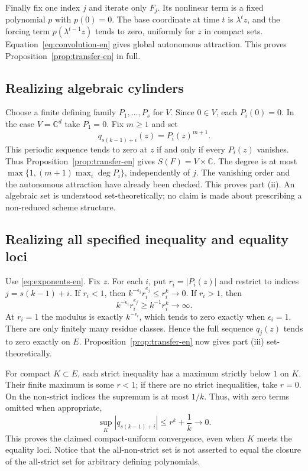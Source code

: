 \documentclass[12pt]{amsart}
\theoremstyle{definition}
\theoremstyle{remark}
\numberwithin{equation}{section}
\newcommand{\C}{\mathbb{C}}
\begin{document}
Finally fix one index $j$ and iterate only $F_j$. Its nonlinear term is a fixed polynomial $p$ with $p(0)=0$. The base coordinate at time $t$ is $\lambda^t z$, and the forcing term $p(\lambda^{t-1}z)$ tends to zero, uniformly for $z$ in compact sets. Equation~\eqref{eq:convolution-en} gives global autonomous attraction. This proves Proposition~\ref{prop:transfer-en} in full.

\subsection{Realizing algebraic cylinders}
Choose a finite defining family $P_1,\ldots,P_s$ for $V$. Since $0\in V$, each $P_i(0)=0$. In the case $V=\C^d$ take $P_1=0$. Fix $m\geq1$ and set
\[
q_{s(k-1)+i}(z)=P_i(z)^{m+1}.
\]
This periodic sequence tends to zero at $z$ if and only if every $P_i(z)$ vanishes. Thus Proposition~\ref{prop:transfer-en} gives $S(F)=V\times\C$. The degree is at most $\max\{1,(m+1)\max_i\deg P_i\}$, independently of $j$. The vanishing order and the autonomous attraction have already been checked. This proves part (ii). An algebraic set is understood set-theoretically; no claim is made about prescribing a non-reduced scheme structure.

\subsection{Realizing all specified inequality and equality loci}
Use \eqref{eq:exponents-en}. Fix $z$. For each $i$, put $r_i=|P_i(z)|$ and restrict to indices $j=s(k-1)+i$.
If $r_i<1$, then $k^{-\epsilon_i}r_i^{e_j}\leq r_i^k\to0$.
If $r_i>1$, then
\[
k^{-\epsilon_i}r_i^{e_j}\geq k^{-1}r_i^k\longrightarrow\infty.
\]
At $r_i=1$ the modulus is exactly $k^{-\epsilon_i}$, which tends to zero exactly when $\epsilon_i=1$. There are only finitely many residue classes. Hence the full sequence $q_j(z)$ tends to zero exactly on $E$. Proposition~\ref{prop:transfer-en} now gives part (iii) set-theoretically.

For compact $K\subset E$, each strict inequality has a maximum strictly below $1$ on $K$. Their finite maximum is some $r<1$; if there are no strict inequalities, take $r=0$. On the non-strict indices the supremum is at most $1/k$. Thus, with zero terms omitted when appropriate,
\[
\sup_K|q_{s(k-1)+i}|\leq r^k+\frac1k\longrightarrow0.
\]
This proves the claimed compact-uniform convergence, even when $K$ meets the equality loci. Notice that the all-non-strict set is not asserted to equal the closure of the all-strict set for arbitrary defining polynomials.
\end{document}
